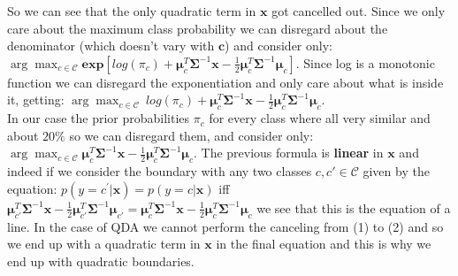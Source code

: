 \documentclass{article}
\begin{document}
So we can see that the only quadratic term in $\textbf{x}$ got cancelled out. Since we only care about the maximum class probability we can disregard about the denominator (which doesn't vary with $\textbf{c}$) and consider only:\\
$\displaystyle\arg\max_{c\in\mathcal{C}}\textbf{exp}[log(\pi_c)+\bm{\mu}_c^T\bm{\Sigma}^{-1}\textbf{x}-\frac{1}{2}\bm{\mu}^T_c\bm{\Sigma}^{-1}\bm{\mu}_c]$. Since log is a monotonic function we can disregard the exponentiation and only care about what is inside it, getting:
$\displaystyle\arg\max_{c\in\mathcal{C}}\ log(\pi_c)+\bm{\mu}_c^T\bm{\Sigma}^{-1}\textbf{x}-\frac{1}{2}\bm{\mu}^T_c\bm{\Sigma}^{-1}\bm{\mu}_c$.\\
In our case the prior probabilities  $\pi_c$ for every class where all very similar and about $20\%$ so we can disregard them, and consider only:\\
$\displaystyle\arg\max_{c\in\mathcal{C}}\bm{\mu}_c^T\bm{\Sigma}^{-1}\textbf{x}-\frac{1}{2}\bm{\mu}^T_c\bm{\Sigma}^{-1}\bm{\mu}_c$.
The previous formula is \textbf{linear} in $\textbf{x}$ and indeed if we consider the boundary with any two classes $c,c'\in\mathcal{C}$ given by the equation:
$p(y=c^{'}|\textbf{x})=p(y=c|\textbf{x})$ iff $\bm{\mu}_{c'}^T\bm{\Sigma}^{-1}\textbf{x}-\frac{1}{2}\bm{\mu}^T_{c'}\bm{\Sigma}^{-1}\bm{\mu}_{c'}=
\bm{\mu}_c^T\bm{\Sigma}^{-1}\textbf{x}-\frac{1}{2}\bm{\mu}^T_c\bm{\Sigma}^{-1}\bm{\mu}_c$ we see that this is the equation of a line.
In the case of QDA we cannot perform the canceling from (1) to (2) and so we end up with a quadratic term in $\textbf{x}$ in the final equation 
and this is why we end up with quadratic boundaries.
\end{document}
